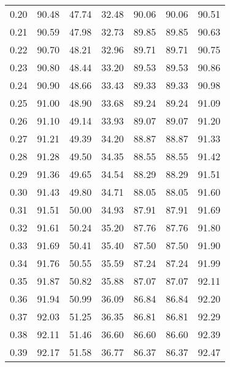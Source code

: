 \begin{tabular}{|c|c|c|c|c|c|c|}
      0.20 &     90.48 &     47.74 &      32.48 &   90.06 &      90.06 &         90.51 \\
      0.21 &     90.59 &     47.98 &      32.73 &   89.85 &      89.85 &         90.63 \\
      0.22 &     90.70 &     48.21 &      32.96 &   89.71 &      89.71 &         90.75 \\
      0.23 &     90.80 &     48.44 &      33.20 &   89.53 &      89.53 &         90.86 \\
      0.24 &     90.90 &     48.66 &      33.43 &   89.33 &      89.33 &         90.98 \\
      0.25 &     91.00 &     48.90 &      33.68 &   89.24 &      89.24 &         91.09 \\
      0.26 &     91.10 &     49.14 &      33.93 &   89.07 &      89.07 &         91.20 \\
      0.27 &     91.21 &     49.39 &      34.20 &   88.87 &      88.87 &         91.33 \\
      0.28 &     91.28 &     49.50 &      34.35 &   88.55 &      88.55 &         91.42 \\
      0.29 &     91.36 &     49.65 &      34.54 &   88.29 &      88.29 &         91.51 \\
      0.30 &     91.43 &     49.80 &      34.71 &   88.05 &      88.05 &         91.60 \\
      0.31 &     91.51 &     50.00 &      34.93 &   87.91 &      87.91 &         91.69 \\
      0.32 &     91.61 &     50.24 &      35.20 &   87.76 &      87.76 &         91.80 \\
      0.33 &     91.69 &     50.41 &      35.40 &   87.50 &      87.50 &         91.90 \\
      0.34 &     91.76 &     50.55 &      35.59 &   87.24 &      87.24 &         91.99 \\
      0.35 &     91.87 &     50.82 &      35.88 &   87.07 &      87.07 &         92.11 \\
      0.36 &     91.94 &     50.99 &      36.09 &   86.84 &      86.84 &         92.20 \\
      0.37 &     92.03 &     51.25 &      36.35 &   86.81 &      86.81 &         92.29 \\
      0.38 &     92.11 &     51.46 &      36.60 &   86.60 &      86.60 &         92.39 \\
      0.39 &     92.17 &     51.58 &      36.77 &   86.37 &      86.37 &         92.47 \\

\end{tabular}
